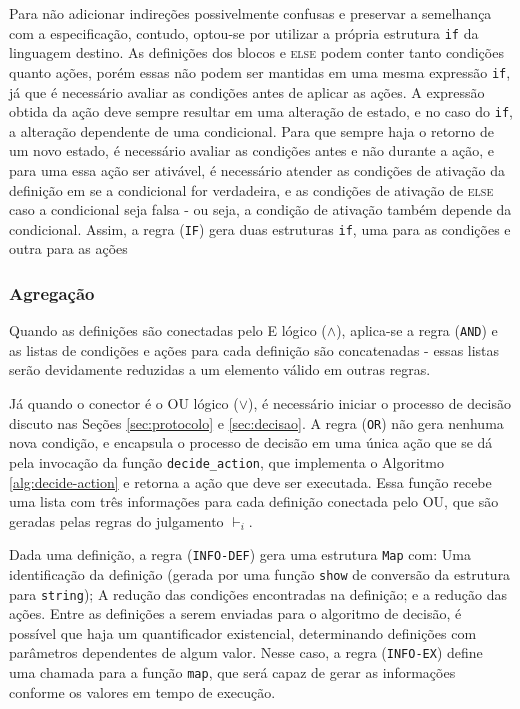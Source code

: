 Para não adicionar
indireções possivelmente confusas e preservar a semelhança com a especificação, contudo, optou-se por utilizar
a própria estrutura \texttt{if} da linguagem destino. As definições dos blocos
\IF e \textsc{else} podem conter tanto condições quanto ações, porém essas não
podem ser mantidas em uma mesma expressão \texttt{if}, já que é necessário
avaliar as condições antes de aplicar as ações. A expressão obtida da ação deve
sempre resultar em uma alteração de estado, e no caso do \texttt{if}, a alteração
dependente de uma condicional. Para que sempre haja o retorno de um novo estado, é necessário avaliar as
condições antes e não durante a ação, e para uma essa ação \IF ser ativável, é necessário
atender as condições de ativação da definição em
\THEN se a condicional for verdadeira, e as condições de ativação de \textsc{else} caso
a condicional seja falsa - ou seja, a condição de ativação também depende da
condicional. Assim, a regra (\texttt{IF}) gera duas estruturas \texttt{if}, uma
para as condições e outra para as ações

\subsubsection{Agregação}


Quando as definições são conectadas pelo E lógico ($\land$), aplica-se a regra
(\texttt{AND}) e as listas de
condições e ações para cada definição são concatenadas - essas listas serão
devidamente reduzidas a um elemento válido em outras regras.

Já quando o conector é o OU lógico ($\lor$), é necessário iniciar o processo de decisão
discuto nas Seções \ref{sec:protocolo} e \ref{sec:decisao}. A regra
(\texttt{OR}) não gera nenhuma nova condição, e encapsula o processo de decisão
em uma única ação que se dá pela invocação da função \texttt{decide\_action},
que implementa o Algoritmo \ref{alg:decide-action} e retorna a ação que deve ser
executada. Essa função recebe uma lista com três informações para cada definição conectada
pelo OU, que são geradas pelas regras do julgamento $\vdash_i$.

Dada uma definição, a regra (\texttt{INFO-DEF}) gera uma estrutura \texttt{Map}
com: Uma identificação da definição (gerada por uma função \texttt{show} de
conversão da estrutura para \texttt{string}); A redução das condições
encontradas na definição; e a redução das ações. Entre as definições a serem
enviadas para o algoritmo de decisão, é possível que haja um quantificador
existencial, determinando definições com parâmetros dependentes
de algum valor. Nesse caso, a regra (\texttt{INFO-EX}) define uma chamada para a
função \texttt{map}, que será capaz de gerar as informações conforme os valores
em tempo de execução.


